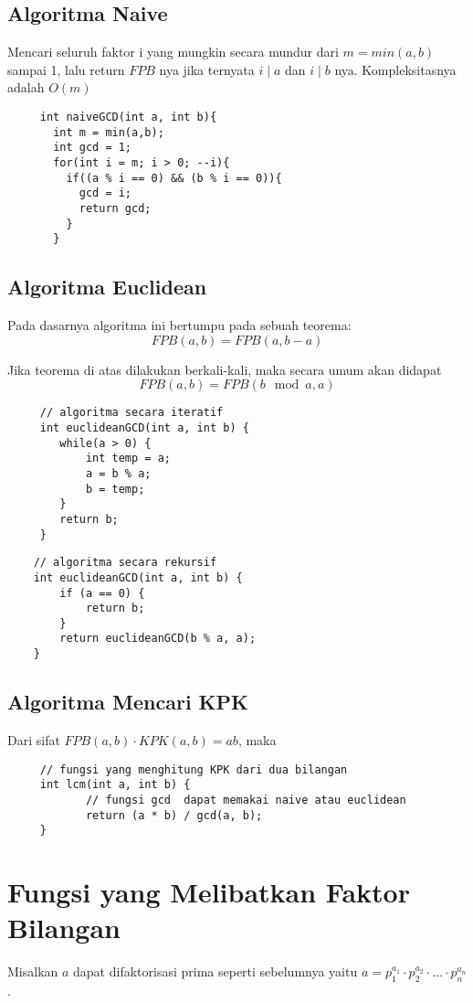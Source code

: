 \documentclass[11pt]{scrartcl}
\begin{document}
	 \subsection{Algoritma Naive}
	 Mencari seluruh faktor i yang mungkin secara mundur dari $m = min(a,b)$ sampai 1, lalu return $FPB$ nya jika ternyata $i \mid a$ dan $i \mid b$ nya. Kompleksitasnya adalah $O(m)$
	 
	 \begin{lstlisting}
	 int naiveGCD(int a, int b){
	   int m = min(a,b);
	   int gcd = 1;
	   for(int i = m; i > 0; --i){
	     if((a % i == 0) && (b % i == 0)){
	       gcd = i;
	       return gcd;
	     }
	   }
	 \end{lstlisting}
	 
	 
	 \subsection{Algoritma Euclidean}
	 Pada dasarnya algoritma ini bertumpu pada sebuah teorema:
	 $$FPB(a,b) = FPB(a,b-a)$$
	 
	 Jika teorema di atas dilakukan berkali-kali, maka secara umum akan didapat
	 $$FPB(a,b) = FPB(b\mod a , a)$$
	 
	 \begin{lstlisting}
	 // algoritma secara iteratif
	 int euclideanGCD(int a, int b) {
	   	while(a > 0) {
	   		int temp = a;
	   		a = b % a;
	   		b = temp;
	 	}
	 	return b;
	 }
	 \end{lstlisting}
	
	\begin{lstlisting}
	// algoritma secara rekursif
	int euclideanGCD(int a, int b) {
	    if (a == 0) {
	        return b;
	    }
	    return euclideanGCD(b % a, a);
	}
	\end{lstlisting}
	
	\subsection{Algoritma Mencari KPK}
	Dari sifat $FPB(a,b) \cdot KPK(a,b) = ab$, maka
	 \begin{lstlisting}
	 // fungsi yang menghitung KPK dari dua bilangan
	 int lcm(int a, int b) {
		 	// fungsi gcd  dapat memakai naive atau euclidean
		 	return (a * b) / gcd(a, b); 
	 }
	 \end{lstlisting}
	 
	  \section{Fungsi yang Melibatkan Faktor Bilangan}
	     Misalkan $a$ dapat difaktorisasi prima seperti sebelumnya yaitu $a=p_1^{a_1}\cdot p_2^{a_2}\cdot \ldots \cdot p_n^{a_n}$.
\end{document}
